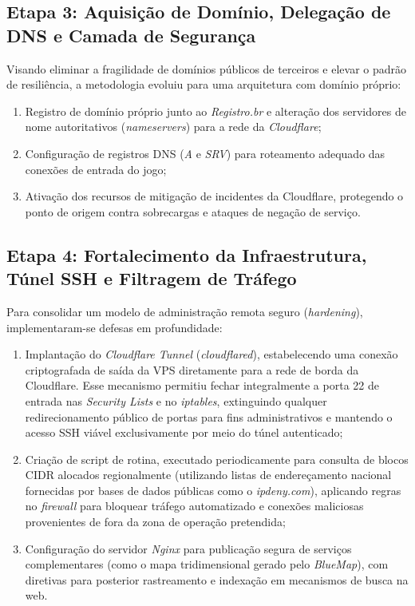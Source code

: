 \subsection{Etapa 3: Aquisição de Domínio, Delegação de DNS e Camada de Segurança}
Visando eliminar a fragilidade de domínios públicos de terceiros e elevar o padrão de resiliência, a metodologia evoluiu para uma arquitetura com domínio próprio:
\begin{enumerate}
    \item Registro de domínio próprio junto ao \textit{Registro.br} e alteração dos servidores de nome autoritativos (\textit{nameservers}) para a rede da \textit{Cloudflare};
    \item Configuração de registros DNS (\textit{A} e \textit{SRV}) para roteamento adequado das conexões de entrada do jogo;
    \item Ativação dos recursos de mitigação de incidentes da Cloudflare, protegendo o ponto de origem contra sobrecargas e ataques de negação de serviço.
\end{enumerate}

\subsection{Etapa 4: Fortalecimento da Infraestrutura, Túnel SSH e Filtragem de Tráfego}
Para consolidar um modelo de administração remota seguro (\textit{hardening}), implementaram-se defesas em profundidade:
\begin{enumerate}
    \item Implantação do \textit{Cloudflare Tunnel} (\textit{cloudflared}), estabelecendo uma conexão criptografada de saída da VPS diretamente para a rede de borda da Cloudflare. Esse mecanismo permitiu fechar integralmente a porta 22 de entrada nas \textit{Security Lists} e no \textit{iptables}, extinguindo qualquer redirecionamento público de portas para fins administrativos e mantendo o acesso SSH viável exclusivamente por meio do túnel autenticado;
    \item Criação de script de rotina, executado periodicamente para consulta de blocos CIDR alocados regionalmente (utilizando listas de endereçamento nacional fornecidas por bases de dados públicas como o \textit{ipdeny.com}), aplicando regras no \textit{firewall} para bloquear tráfego automatizado e conexões maliciosas provenientes de fora da zona de operação pretendida;
    \item Configuração do servidor \textit{Nginx} para publicação segura de serviços complementares (como o mapa tridimensional gerado pelo \textit{BlueMap}), com diretivas para posterior rastreamento e indexação em mecanismos de busca na web.
\end{enumerate}
